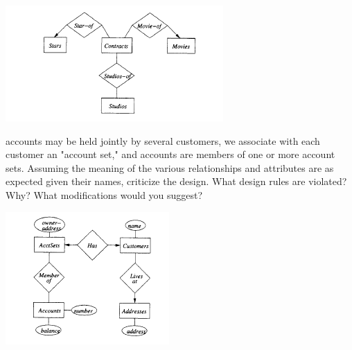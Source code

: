 \documentclass[12pt]{article}
\begin{document}
\begin{enumerate}[1.]
    \begin{center}
    \includegraphics[width=0.7\linewidth]{images/worksheet_14_1.png}
    \end{center}

    accounts may be held jointly by several customers, we associate with each customer
    an "account set," and accounts are members of one or more account sets.
    Assuming the meaning of the various relationships and attributes are as expected
    given their names, criticize the design. What design rules are violated?
    Why? What modifications would you suggest?

    \bigskip

    \begin{center}
    \includegraphics[width=0.7\linewidth]{images/worksheet_14_2.png}
    \end{center}


\end{enumerate}
\end{document}

